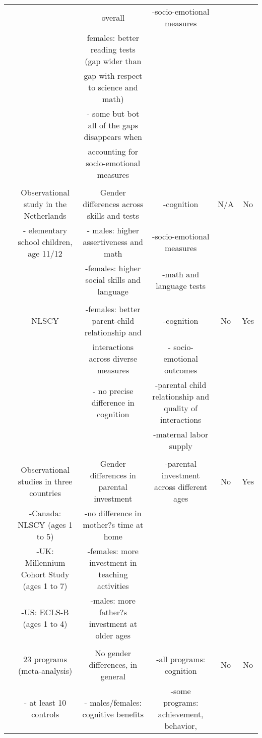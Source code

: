 \begin{tabular}{cccccc}
	&		&	overall 	&	-socio-emotional measures	&		&		\\ 
	&		&	females: better reading tests (gap wider than 	&		&		&		\\ 
	&		&	gap with respect to science and math)	&		&		&		\\ 
	&		&	- some but bot all of the gaps disappears when	&		&		&		\\ 
	&		&	accounting for socio-emotional measures 	&		&		&		\\ \\ \midrule
\citet{golsteyn2014gender}	&	Observational study in the Netherlands	&	Gender differences across skills and tests	&	-cognition	&	N/A 	&	No	\\ 
	&	- elementary school children, age 11/12 	&	- males: higher assertiveness and math	&	-socio-emotional measures	&		&		\\ 
	&		&	-females: higher social skills and language	&	-math and language tests	&		&		\\ \\ \midrule
\citet{kottelenberg_Gender}	&	NLSCY	&	-females: better parent-child relationship and 	&	-cognition	&	No	&	Yes	\\ 
	&		&	interactions across diverse measures	&	- socio-emotional outcomes	&		&		\\ 
	&		&	- no precise difference in cognition	&	-parental child relationship and quality of interactions	&		&		\\ 
	&		&		&	-maternal labor supply	&		&		\\ \\ \midrule
\citet{Baker-Milligan_2013_Boy-Girl-Differences}	&	Observational studies in three countries	&	Gender differences in parental investment 	&	-parental investment across different ages	&	No	&	Yes	\\ 
	&	-Canada: NLSCY (ages 1 to 5)	&	-no difference in mother?s time at home 	&		&		&		\\ 
	&	-UK: Millennium Cohort Study (ages 1 to 7)	&	-females: more investment in teaching activities	&		&		&		\\ 
	&	-US: ECLS-B (ages 1 to 4)	&	-males: more father?s investment at older ages	&		&		&		\\ \\ \midrule
\citet{Magnuson_Kelchen_Duncan_etal_2016_ECRQ}	&	23 programs (meta-analysis)	&	No gender differences, in general	&	-all programs: cognition	&	No	&	No	\\ 
	&	- at least 10 controls	&	- males/females: cognitive benefits	&	-some programs: achievement, behavior,	&		&		\\ 

\end{tabular}
